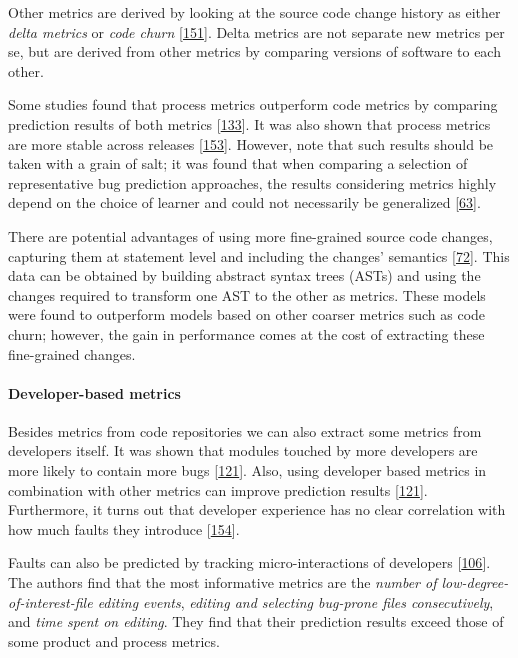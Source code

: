 \documentclass[]{book}
\let\oldparagraph\paragraph
\renewcommand{\paragraph}[1]{\oldparagraph{#1}\mbox{}}
\begin{document}
Other metrics are derived by looking at the source code change history
as either \emph{delta metrics} or \emph{code churn}
{[}\protect\hyperlink{ref-Radjenovic2013}{151}{]}. Delta metrics are not
separate new metrics per se, but are derived from other metrics by
comparing versions of software to each other.

Some studies found that process metrics outperform code metrics by
comparing prediction results of both metrics
{[}\protect\hyperlink{ref-Moser2008}{133}{]}. It was also shown that
process metrics are more stable across releases
{[}\protect\hyperlink{ref-Rahman2013}{153}{]}. However, note that such
results should be taken with a grain of salt; it was found that when
comparing a selection of representative bug prediction approaches, the
results considering metrics highly depend on the choice of learner and
could not necessarily be generalized
{[}\protect\hyperlink{ref-DAmbros2012}{63}{]}.

There are potential advantages of using more fine-grained source code
changes, capturing them at statement level and including the changes'
semantics {[}\protect\hyperlink{ref-Giger2011}{72}{]}. This data can be
obtained by building abstract syntax trees (ASTs) and using the changes
required to transform one AST to the other as metrics. These models were
found to outperform models based on other coarser metrics such as code
churn; however, the gain in performance comes at the cost of extracting
these fine-grained changes.

\paragraph{Developer-based metrics}\label{developer-based-metrics}

Besides metrics from code repositories we can also extract some metrics
from developers itself. It was shown that modules touched by more
developers are more likely to contain more bugs
{[}\protect\hyperlink{ref-Matsumoto2010}{121}{]}. Also, using developer
based metrics in combination with other metrics can improve prediction
results {[}\protect\hyperlink{ref-Matsumoto2010}{121}{]}. Furthermore,
it turns out that developer experience has no clear correlation with how
much faults they introduce
{[}\protect\hyperlink{ref-rahman2011}{154}{]}.

Faults can also be predicted by tracking micro-interactions of
developers {[}\protect\hyperlink{ref-Lee2011}{106}{]}. The authors find
that the most informative metrics are the \emph{number of
low-degree-of-interest-file editing events}, \emph{editing and selecting
bug-prone files consecutively}, and \emph{time spent on editing}. They
find that their prediction results exceed those of some product and
process metrics.
\end{document}
